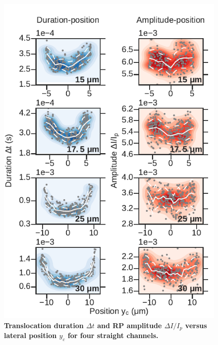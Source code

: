 				\begin{figure}
					\includegraphics[width=.75\textwidth]{dtdIy.pdf}
					\caption{\textbf{Translocation duration $\Delta t$ and RP amplitude $\Delta I/I_{p}$ versus lateral position $y_{c}$ for four straight channels.}}
					\label{fig:dtdIy}
				\end{figure}
				
